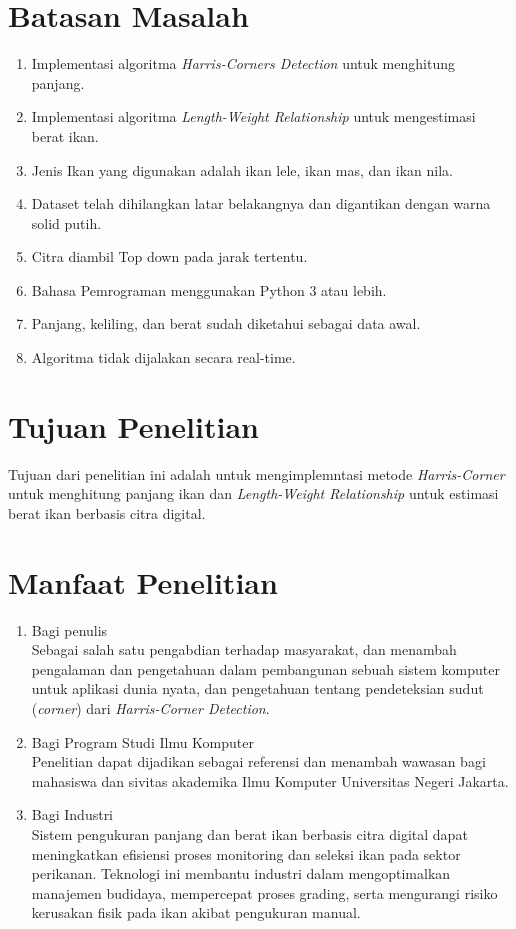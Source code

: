 \section{Batasan Masalah}
\begin{enumerate}
	\item Implementasi algoritma \emph{Harris-Corners Detection} untuk menghitung panjang.
    \item Implementasi algoritma \emph{Length-Weight Relationship} untuk mengestimasi berat ikan. 
	\item Jenis Ikan yang digunakan adalah ikan lele, ikan mas, dan ikan nila.
	\item Dataset telah dihilangkan latar belakangnya dan digantikan dengan warna solid putih.
	\item Citra diambil Top down pada jarak tertentu. 
	\item Bahasa Pemrograman menggunakan Python 3 atau lebih. 
    \item Panjang, keliling, dan berat sudah diketahui sebagai data awal.
    \item Algoritma tidak dijalakan secara real-time.
\end{enumerate}
	
\section{Tujuan Penelitian}
Tujuan dari penelitian ini adalah untuk mengimplemntasi metode \emph{Harris-Corner} untuk menghitung panjang ikan dan \emph{Length-Weight Relationship} untuk estimasi berat ikan berbasis citra digital.

\section{Manfaat Penelitian}
\begin{enumerate}
    \item Bagi penulis\\
    Sebagai salah satu pengabdian terhadap masyarakat, dan menambah pengalaman dan pengetahuan dalam pembangunan sebuah sistem komputer untuk aplikasi dunia nyata, dan pengetahuan tentang pendeteksian sudut (\emph{corner}) dari \emph{Harris-Corner Detection}.
    
    \item Bagi Program Studi Ilmu Komputer\\
    Penelitian dapat dijadikan sebagai referensi dan menambah wawasan bagi mahasiswa dan sivitas akademika Ilmu Komputer Universitas Negeri Jakarta.

    \item Bagi Industri\\
    Sistem pengukuran panjang dan berat ikan berbasis citra digital dapat meningkatkan efisiensi proses monitoring dan seleksi ikan pada sektor perikanan. Teknologi ini membantu industri dalam mengoptimalkan manajemen budidaya, mempercepat proses grading, serta mengurangi risiko kerusakan fisik pada ikan akibat pengukuran manual.
\end{enumerate}

